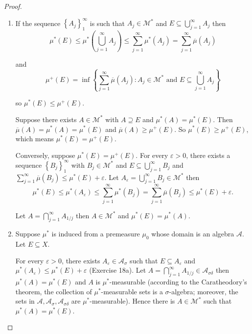 \begin{proof}
    \begin{enumerate}[itemsep=0pt,label={\textbf{\alph*.}}]
        \item If the sequence \( {\left\{ A_{j} \right\}}_{1}^{\infty} \) is such that \( A_{j} \in \mathcal{M}^{\ast} \) and \( E \subseteq \bigcup_{j=1}^{\infty} A_{j} \) then
              \[
                  \mu^{\ast}(E) \le \mu^{\ast}\left( \bigcup_{j=1}^{\infty} A_{j} \right) \le \sum_{j=1}^{\infty} \mu^{\ast}(A_{j}) = \sum_{j=1}^{\infty} \overline{\mu}(A_{j})
              \]

              and
              \[
                  \mu^{+}(E) = \inf\left\{ \sum_{j=1}^{\infty} \overline{\mu}(A_{j}) : A_{j} \in \mathcal{M}^{\ast} \text{ and } E \subseteq \bigcup_{j=1}^{\infty} A_{j} \right\}
              \]

              so \( \mu^{\ast}(E) \le \mu^{+}(E) \).

              \bigskip

              Suppose there exists \( A \in \mathcal{M}^{\ast} \) with \( A \supseteq E \) and \( \mu^{\ast}(A) = \mu^{\ast}(E) \). Then \( \overline{\mu}(A) = \mu^{\ast}(A) = \mu^{\ast}(E) \) and \( \overline{\mu}(A) \ge \mu^{+}(E) \). So \( \mu^{\ast}(E) \ge \mu^{+}(E) \), which means \( \mu^{\ast}(E) = \mu^{+}(E) \).

              Conversely, suppose \( \mu^{\ast}(E) = \mu^{+}(E) \). For every \( \varepsilon > 0 \), there exists a sequence \( {\left\{ B_{j} \right\}}_{1}^{\infty} \) with \( B_{j} \in \mathcal{M}^{\ast} \) and \( E \subseteq \bigcup_{j=1}^{\infty} B_{j} \) and \( \sum_{j=1}^{\infty} \overline{\mu}(B_{j}) \le \mu^{\ast}(E) + \varepsilon \). Let \( A_{\varepsilon} = \bigcup_{j=1}^{\infty} B_{j} \in \mathcal{M}^{\ast} \) then
              \[
                  \mu^{\ast}(E) \le \mu^{\ast}(A_{\varepsilon}) \le \sum_{j=1}^{\infty} \mu^{\ast}(B_{j}) = \sum_{j=1}^{\infty} \overline{\mu}(B_{j}) \le \mu^{\ast}(E) + \varepsilon.
              \]

              Let \( A = \bigcap_{j=1}^{\infty} A_{1/j} \) then \( A \in \mathcal{M}^{\ast} \) and \( \mu^{\ast}(E) = \mu^{\ast}(A) \).
        \item Suppose \( \mu^{\ast} \) is induced from a premeasure \( \mu_{0} \) whose domain is an algebra \( \mathcal{A} \). Let \( E \subseteq X \).

              For every \( \varepsilon > 0 \), there exists \( A_{\varepsilon} \in \mathcal{A}_{\sigma} \) such that \( E \subseteq A_{\varepsilon} \) and \( \mu^{\ast}(A_{\varepsilon}) \le \mu^{\ast}(E) + \varepsilon \) (Exercise 18a). Let \( A = \bigcap_{j=1}^{\infty} A_{1/j} \in \mathcal{A}_{\sigma\delta} \) then \( \mu^{\ast}(A) = \mu^{\ast}(E) \) and \( A \) is \( \mu^{\ast} \)-measurable (according to the Caratheodory's theorem, the collection of \( \mu^{\ast} \)-measurable sets is a \(\sigma\)-algebra; moreover, the sets in \( \mathcal{A}, \mathcal{A}_{\sigma}, \mathcal{A}_{\sigma\delta} \) are \( \mu^{\ast} \)-measurable). Hence there is \( A \in \mathcal{M}^{\ast} \) such that \( \mu^{\ast}(A) = \mu^{\ast}(E) \).


\end{enumerate}
\end{proof}
